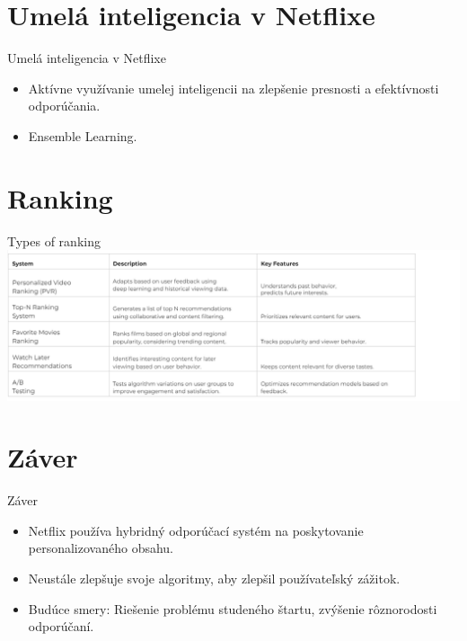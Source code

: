 \documentclass{beamer}
\begin{document}
\section{Umelá inteligencia v Netflixe}

\begin{frame}{Umelá inteligencia v Netflixe}
    \begin{itemize}
        \item Aktívne využívanie umelej inteligencii na zlepšenie presnosti a efektívnosti odporúčania.
        \item Ensemble Learning.
    \end{itemize}
\end{frame}

\section{Ranking}

\begin{frame}{Types of ranking}
    \includegraphics[scale=0.5]{Images_tables/table.png}
\end{frame}

\section{Záver}

\begin{frame}{Záver}
    \begin{itemize}
        \item Netflix používa hybridný odporúčací systém na poskytovanie personalizovaného obsahu.
        \item Neustále zlepšuje svoje algoritmy, aby zlepšil používateľský zážitok.
        \item Budúce smery: Riešenie problému studeného štartu, zvýšenie rôznorodosti odporúčaní.
    \end{itemize}
\end{frame}
\end{document}
